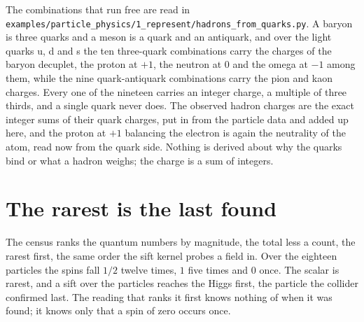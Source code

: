 The combinations that run free are read in
\texttt{examples/\allowbreak{}particle\_physics/\allowbreak{}1\_represent/\allowbreak{}hadrons\_from\_quarks.py}.
A baryon is three quarks and a meson is a quark and an antiquark, and over the light quarks u, d and s
the ten three-quark combinations carry the charges of the baryon decuplet, the proton at $+1$, the
neutron at $0$ and the omega at $-1$ among them, while the nine quark-antiquark combinations carry the
pion and kaon charges. Every one of the nineteen carries an integer charge, a multiple of three thirds,
and a single quark never does. The observed hadron charges are the exact integer sums of their quark
charges, put in from the particle data and added up here, and the proton at $+1$ balancing the electron
is again the neutrality of the atom, read now from the quark side. Nothing is derived about why the
quarks bind or what a hadron weighs; the charge is a sum of integers.

\section{The rarest is the last found}

The census ranks the quantum numbers by magnitude, the total less a count, the rarest first, the same
order the sift kernel probes a field in. Over the eighteen particles the spins fall $1/2$ twelve times,
$1$ five times and $0$ once. The scalar is rarest, and a sift over the particles reaches the Higgs
first, the particle the collider confirmed last. The reading that ranks it first knows nothing of when it was
found; it knows only that a spin of zero occurs once.
